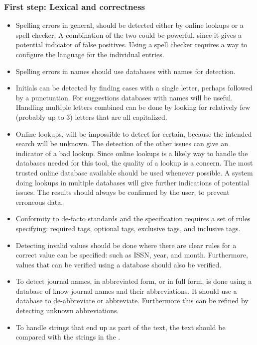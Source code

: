 \subsubsection{First step: Lexical and correctness}
\begin{itemize}
\item Spelling errors in general, should be detected either by online
  lookups or a spell checker.  A combination of the two could be
  powerful, since it gives a potential indicator of false positives.
  Using a spell checker requires a way to configure the language for
  the individual entries.

\item Spelling errors in names should use databases with
  names for detection.

\item Initials can be detected by finding cases with a single letter,
  perhaps followed by a punctuation.  For suggestions databases with
  names will be useful.  Handling multiple letters combined can be
  done by looking for relatively few (probably up to 3) letters that
  are all capitalized.

\item Online lookups, will be impossible to detect for certain,
  because the intended search will be unknown.  The detection of the
  other issues can give an indicator of a bad lookup.  Since online
  lookups is a likely way to handle the databases needed for this
  tool, the quality of a lookup is a concern.  The most trusted online
  database available should be used whenever possible.  A system doing
  lookups in multiple databases will give further indications of
  potential issues.  The results should always be confirmed by the
  user, to prevent erroneous data.

\item Conformity to de-facto standards and the {\bibtex} specification
  requires a set of rules specifying: required tags, optional tags,
  exclusive tags, and inclusive tags.

\item Detecting invalid values should be done where there are clear
  rules for a correct value can be specified: such as ISSN, year, and
  month.  Furthermore, values that can be verified using a database
  should also be verified.

\item To detect journal names, in abbreviated form, or in full form,
  is done using a database of know journal names and their
  abbreviations.  It should use a database to de-abbreviate or
  abbreviate.  Furthermore this can be refined by detecting unknown
  abbreviations.

\item To handle {\bibtex} strings that end up as part of the text, the
  text should be compared with the strings in the .
\end{itemize}


